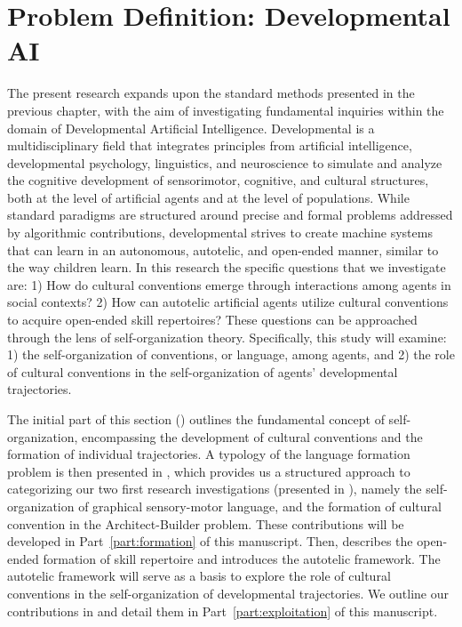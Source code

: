 \chapter{Problem Definition: Developmental AI}
\minitoc

The present research expands upon the standard \ai methods presented in the previous chapter, with the aim of investigating fundamental inquiries within the domain of \gls{Developmental Artificial Intelligence}. Developmental \ai is a multidisciplinary field that integrates principles from artificial intelligence, developmental psychology, linguistics, and neuroscience to simulate and analyze the cognitive development of sensorimotor, cognitive, and cultural structures, both at the level of artificial agents and at the level of populations. While standard \ai paradigms are structured around precise and formal problems addressed by algorithmic contributions, developmental \ai strives to create machine systems that can learn in an autonomous, autotelic, and open-ended manner, similar to the way children learn. In this research the specific questions that we investigate are: 1) How do cultural conventions emerge through interactions among agents in social contexts? 2) How can autotelic artificial agents utilize cultural conventions to acquire open-ended skill repertoires? These questions can be approached through the lens of self-organization theory. Specifically, this study will examine: 1) the self-organization of conventions, or language, among agents, and 2) the role of cultural conventions in the self-organization of agents' developmental trajectories. 

The initial part of this section () outlines the fundamental concept of self-organization, encompassing the development of cultural conventions and the formation of individual trajectories. A typology of the language formation problem is then presented in , which provides us a structured approach to categorizing our two first research investigations (presented in ), namely the self-organization of graphical sensory-motor language, and the formation of cultural convention in the Architect-Builder problem. These contributions will be developed in Part~\ref{part:formation} of this manuscript. Then,  describes the open-ended formation of skill repertoire and introduces the autotelic \rl framework. The autotelic \rl framework will serve as a basis to explore the role of cultural conventions in the self-organization of developmental trajectories. We outline our contributions in  and detail them in Part~\ref{part:exploitation} of this manuscript. 

